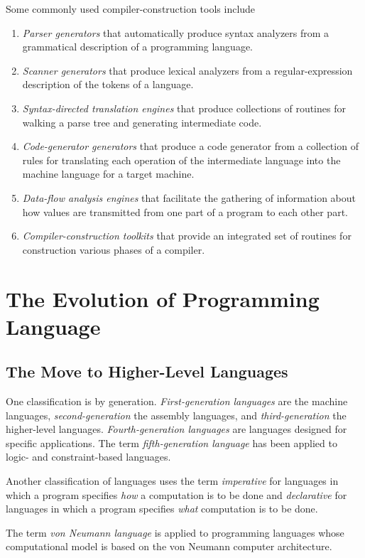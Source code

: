 \documentclass[a4paper,twoside]{book}
\begin{document}
Some commonly used compiler-construction tools include
\begin{enumerate}
    \item \textit{Parser generators} that automatically produce syntax analyzers from a grammatical description of a programming language.
    \item \textit{Scanner generators} that produce lexical analyzers from a regular-expression description of the tokens of a language.
    \item \textit{Syntax-directed translation engines} that produce collections of routines for walking a parse tree and generating intermediate code.
    \item \textit{Code-generator generators} that produce a code generator from a collection of rules for translating each operation of the intermediate language into the machine language for a target machine.
    \item \textit{Data-flow analysis engines} that facilitate the gathering of information about how values are transmitted from one part of a program to each other part.
    \item \textit{Compiler-construction toolkits} that provide an integrated set of routines for construction various phases of a compiler.
\end{enumerate}

\section{The Evolution of Programming Language}
\subsection{The Move to Higher-Level Languages}

One classification is by generation. \textit{First-generation languages} are the machine languages, \textit{second-generation} the assembly languages, and \textit{third-generation} the higher-level languages. \textit{Fourth-generation languages} are languages designed for specific applications. The term \textit{fifth-generation language} has been applied to logic- and constraint-based languages.

Another classification of languages uses the term \textit{imperative} for languages in which a program specifies \textit{how} a computation is to be done and \textit{declarative} for languages in which a program specifies \textit{what} computation is to be done.

The term \textit{von Neumann language} is applied to programming languages whose computational model is based on the von Neumann computer architecture.
\end{document}
